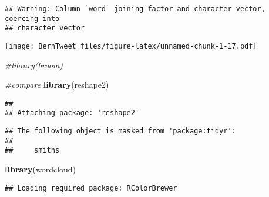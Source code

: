 \documentclass[]{article}
\newenvironment{Shaded}{\begin{snugshade}}{\end{snugshade}}
\newcommand{\CommentTok}[1]{\textcolor[rgb]{0.56,0.35,0.01}{\textit{#1}}}
\newcommand{\DataTypeTok}[1]{\textcolor[rgb]{0.13,0.29,0.53}{#1}}
\newcommand{\DecValTok}[1]{\textcolor[rgb]{0.00,0.00,0.81}{#1}}
\newcommand{\KeywordTok}[1]{\textcolor[rgb]{0.13,0.29,0.53}{\textbf{#1}}}
\newcommand{\NormalTok}[1]{#1}
\newcommand{\OperatorTok}[1]{\textcolor[rgb]{0.81,0.36,0.00}{\textbf{#1}}}
\newcommand{\OtherTok}[1]{\textcolor[rgb]{0.56,0.35,0.01}{#1}}
\newcommand{\StringTok}[1]{\textcolor[rgb]{0.31,0.60,0.02}{#1}}
\begin{document}
\begin{verbatim}
## Warning: Column `word` joining factor and character vector, coercing into
## character vector
\end{verbatim}

\texttt{[image: BernTweet\_files/figure-latex/unnamed-chunk-1-17.pdf]}

\begin{Shaded}
\begin{Highlighting}[]
\CommentTok{#library(broom)}

\CommentTok{#compare}
\KeywordTok{library}\NormalTok{(reshape2)}
\end{Highlighting}
\end{Shaded}

\begin{verbatim}
## 
## Attaching package: 'reshape2'
\end{verbatim}

\begin{verbatim}
## The following object is masked from 'package:tidyr':
## 
##     smiths
\end{verbatim}

\begin{Shaded}
\begin{Highlighting}[]
\KeywordTok{library}\NormalTok{(wordcloud)}
\end{Highlighting}
\end{Shaded}

\begin{verbatim}
## Loading required package: RColorBrewer
\end{verbatim}

\begin{Shaded}
\end{Shaded}
\end{document}
